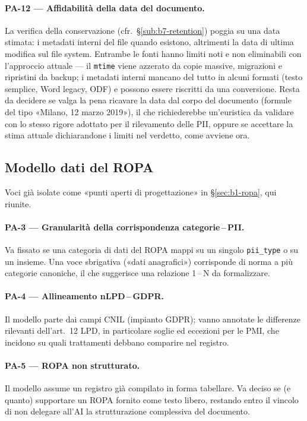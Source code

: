 \paragraph{PA-12 — Affidabilità della data del documento.} La verifica della conservazione (cfr.~§\ref{sub:b7-retention}) poggia su una data stimata: i metadati interni del file quando esistono, altrimenti la data di ultima modifica sul file system. Entrambe le fonti hanno limiti noti e non eliminabili con l'approccio attuale --- il \texttt{mtime} viene azzerato da copie massive, migrazioni e ripristini da backup; i metadati interni mancano del tutto in alcuni formati (testo semplice, Word legacy, ODF) e possono essere riscritti da una conversione. Resta da decidere se valga la pena ricavare la data dal corpo del documento (formule del tipo «Milano, 12 marzo 2019»), il che richiederebbe un'euristica da validare con lo stesso rigore adottato per il rilevamento delle PII, oppure se accettare la stima attuale dichiarandone i limiti nel verdetto, come avviene ora.

\subsection{Modello dati del ROPA}
\label{sub:pa-ropa}

Voci già isolate come «punti aperti di progettazione» in §\ref{sec:b1-ropa}, qui riunite.

\paragraph{PA-3 — Granularità della corrispondenza categorie\,--\,PII.} Va fissato se una categoria di dati del ROPA mappi su un singolo \texttt{pii\_type} o su un insieme. Una voce sbrigativa («dati anagrafici») corrisponde di norma a più categorie canoniche, il che suggerisce una relazione 1\,--\,N da formalizzare.

\paragraph{PA-4 — Allineamento nLPD\,--\,GDPR.} Il modello parte dai campi CNIL (impianto GDPR); vanno annotate le differenze rilevanti dell'art.~12 LPD, in particolare soglie ed eccezioni per le PMI, che incidono su quali trattamenti debbano comparire nel registro.

\paragraph{PA-5 — ROPA non strutturato.} Il modello assume un registro già compilato in forma tabellare. Va deciso se (e quanto) supportare un ROPA fornito come testo libero, restando entro il vincolo di non delegare all'AI la strutturazione complessiva del documento.

